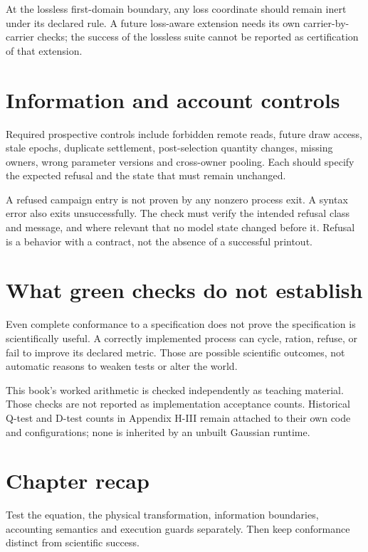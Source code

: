 At the lossless first-domain boundary, any loss coordinate should remain
inert under its declared rule. A future loss-aware extension needs its own
carrier-by-carrier checks; the success of the lossless suite cannot be
reported as certification of that extension.

\section{Information and account controls}
Required prospective controls include forbidden remote reads, future draw
access, stale epochs, duplicate settlement, post-selection quantity changes,
missing owners, wrong parameter versions and cross-owner pooling. Each
should specify the expected refusal and the state that must remain unchanged.

A refused campaign entry is not proven by any nonzero process exit. A syntax
error also exits unsuccessfully. The check must verify the intended refusal
class and message, and where relevant that no model state changed before it.
Refusal is a behavior with a contract, not the absence of a successful printout.

\section{What green checks do not establish}
Even complete conformance to a specification does not prove the specification
is scientifically useful. A correctly implemented process can cycle, ration,
refuse, or fail to improve its declared metric. Those are possible scientific
outcomes, not automatic reasons to weaken tests or alter the world.

This book's worked arithmetic is checked independently as teaching material.
Those checks are not reported as implementation acceptance counts. Historical
Q-test and D-test counts in Appendix H-III remain attached to their own code
and configurations; none is inherited by an unbuilt Gaussian runtime.

\section*{Chapter recap}
Test the equation, the physical transformation, information boundaries,
accounting semantics and execution guards separately. Then keep conformance
distinct from scientific success.
